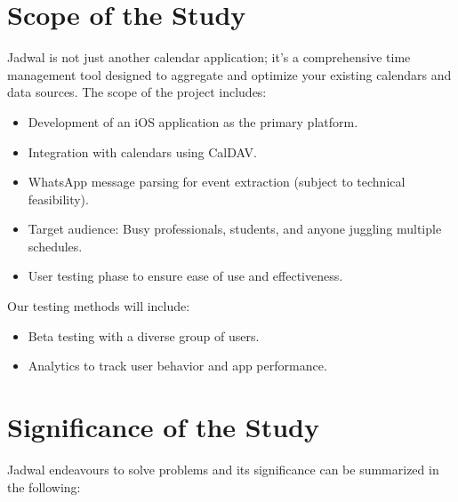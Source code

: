 \documentclass[12pt,a4paper]{report}
\begin{document}
\section{Scope of the Study}

Jadwal is not just another calendar application; it's a comprehensive time management tool designed to aggregate and optimize your existing calendars and data sources. The scope of the project includes:

\begin{itemize}
    \item Development of an iOS application as the primary platform.
    \item Integration with calendars using CalDAV.
    \item WhatsApp message parsing for event extraction (subject to technical feasibility).
    \item Target audience: Busy professionals, students, and anyone juggling multiple schedules.
    \item User testing phase to ensure ease of use and effectiveness.
\end{itemize}

Our testing methods will include:
\begin{itemize}
    \item Beta testing with a diverse group of users.
    \item Analytics to track user behavior and app performance.
\end{itemize}

\section{Significance of the Study}

Jadwal endeavours to solve problems and its significance can be summarized in the following:
\end{document}
